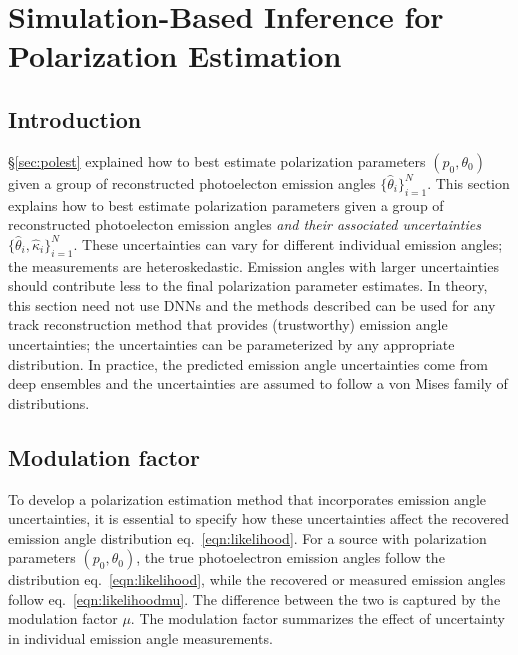 \chapter{Simulation-Based Inference for Polarization Estimation}
\label{chap:sbi}

\section{Introduction}
\S\ref{sec:polest} explained how to best estimate polarization parameters $(p_0, \theta_0)$ given a group of reconstructed photoelecton emission angles $\{\hat{\theta}_i\}^N_{i=1}$. This section explains how to best estimate polarization parameters given a group of reconstructed photoelecton emission angles \textit{and their associated uncertainties} $\{\hat{\theta}_i, \hat{\kappa}_i\}^N_{i=1}$. These uncertainties can vary for different individual emission angles; the measurements are heteroskedastic.
Emission angles with larger uncertainties should contribute less to the final polarization parameter estimates. In theory, this section need not use DNNs and the methods described can be used for any track reconstruction method that provides (trustworthy) emission angle uncertainties; the uncertainties can be parameterized by any appropriate distribution. In practice, the predicted emission angle uncertainties come from deep ensembles and the uncertainties are assumed to follow a von Mises family of distributions. 

\section{Modulation factor}
To develop a polarization estimation method that incorporates emission angle uncertainties, it is essential to specify how these uncertainties affect the recovered emission angle distribution eq.~\ref{eqn:likelihood}. For a source with polarization parameters $(p_0, \theta_0)$, the true photoelectron emission angles follow the distribution eq.~\ref{eqn:likelihood}, while the recovered or measured emission angles follow eq.~\ref{eqn:likelihoodmu}. The difference between the two is captured by the modulation factor $\mu$. The modulation factor summarizes the effect of uncertainty in individual emission angle measurements.  

